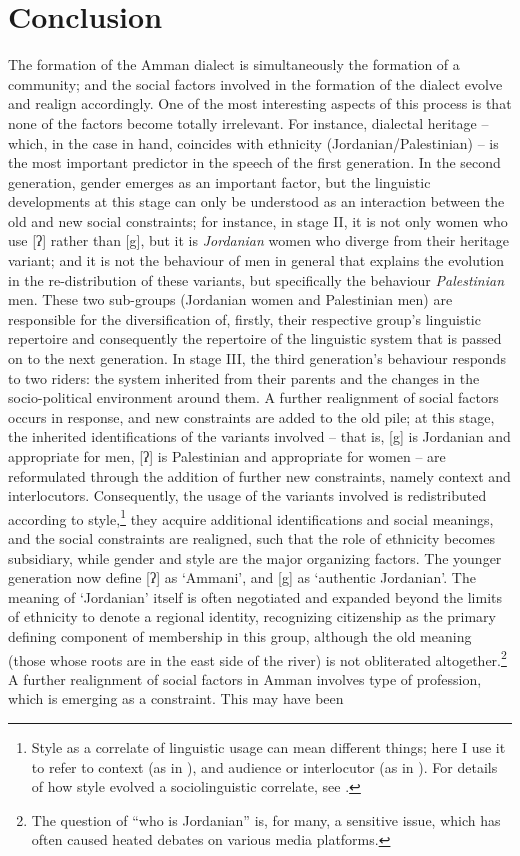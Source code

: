 \documentclass[output=paper]{langsci/langscibook}
\begin{document}
\section{Conclusion}

The formation of the Amman dialect is simultaneously the formation of a community; and the social factors involved in the formation of the dialect evolve and realign accordingly. One of the most interesting aspects of this process is that none of the factors become totally irrelevant. For instance, dialectal heritage – which, in the case in hand, coincides with ethnicity (Jordanian/Palestinian) – is the most important predictor in the speech of the first generation. In the second generation, gender emerges as an important factor, but the linguistic developments at this stage can only be understood as an interaction between the old and new social constraints; for instance, in stage II, it is not only women who use [ʔ] rather than [g], but it is \textit{Jordanian} women who diverge from their heritage variant; and it is not the behaviour of men in general that explains the evolution in the re-distribution of these variants, but specifically the behaviour \textit{Palestinian} men. These two sub-groups (Jordanian women and Palestinian men) are responsible for the diversification of, firstly, their respective group’s linguistic repertoire and consequently the repertoire of the linguistic system that is passed on to the next generation. In stage III, the third generation’s behaviour responds to two riders: the system inherited from their parents and the changes in the socio-political environment around them. A further realignment of social factors occurs in response, and new constraints are added to the old pile; at this stage, the inherited identifications of the variants involved – that is, [g] is Jordanian and appropriate for men, [ʔ] is Palestinian and appropriate for women – are reformulated through the addition of further new constraints, namely context and interlocutors. Consequently, the usage of the variants involved is redistributed according to style,\footnote{Style as a correlate of linguistic usage can mean different things; here I use it to refer to context (as in \citealt{Labov1972}), and audience or interlocutor (as in \citealt{Bell1984}). For details of how style evolved a sociolinguistic correlate, see \citet{EckertRickford2001}.} they acquire additional identifications and social meanings, and the social constraints are realigned, such that the role of ethnicity becomes subsidiary, while gender and style are the major organizing factors. The younger generation now define [ʔ] as ‘Ammani’, and [g] as ‘authentic Jordanian’. The meaning of ‘Jordanian’ itself is often negotiated and expanded beyond the limits of ethnicity to denote a regional identity, recognizing citizenship as the primary defining component of membership in this group, although the old meaning (those whose roots are in the east side of the river) is not obliterated altogether.\footnote{The question of “who is Jordanian” is, for many, a sensitive issue, which has often caused heated debates on various media platforms.} A further realignment of social factors in Amman involves type of profession, which is emerging as a constraint. This may have been 
\end{document}
